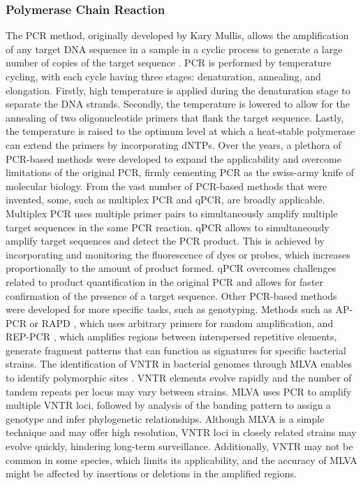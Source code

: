 \subsubsection{Polymerase Chain Reaction}

The \ac{PCR} method, originally developed by Kary Mullis, allows the amplification of any target \ac{DNA} sequence in a sample in a cyclic process to generate a large number of copies of the target sequence \cite{mullis_specific_1986}. \ac{PCR} is performed by temperature cycling, with each cycle having three stages: denaturation, annealing, and elongation. Firstly, high temperature is applied during the denaturation stage to separate the \ac{DNA} strands. Secondly, the temperature is lowered to allow for the annealing of two oligonucleotide primers that flank the target sequence. Lastly, the temperature is raised to the optimum level at which a heat-stable polymerase can extend the primers by incorporating \ac{dNTP}s. Over the years, a plethora of \ac{PCR}-based methods were developed to expand the applicability and overcome limitations of the original \ac{PCR}, firmly cementing \ac{PCR} as the swiss-army knife of molecular biology.
From the vast number of \ac{PCR}-based methods that were invented, some, such as multiplex \ac{PCR} and \ac{qPCR}, are broadly applicable. Multiplex \ac{PCR} \cite{chamberlain_deletion_1988} uses multiple primer pairs to simultaneously amplify multiple target sequences in the same \ac{PCR} reaction.
\ac{qPCR} \cite{higuchi_simultaneous_1992, kubista_real-time_2006} allows to simultaneously amplify target sequences and detect the \ac{PCR} product. This is achieved by incorporating and monitoring the fluorescence of dyes or probes, which increases proportionally to the amount of product formed. \ac{qPCR} overcomes challenges related to product quantification in the original \ac{PCR} and allows for faster confirmation of the presence of a target sequence.
Other \ac{PCR}-based methods were developed for more specific tasks, such as genotyping. Methods such as \ac{AP-PCR or RAPD} \cite{welsh_fingerprinting_1990, williams_dna_1990}, which uses arbitrary primers for random amplification, and \ac{REP-PCR} \cite{versalovic_distribution_1991, de_bruijn_use_1992}, which amplifies regions between interspersed repetitive elements, generate fragment patterns that can function as signatures for specific bacterial strains. The identification of \ac{VNTR} in bacterial genomes through \ac{MLVA} enables to identify polymorphic sites \cite{lindstedt_multiple-locus_2005}. \ac{VNTR} elements evolve rapidly and the number of tandem repeats per locus may vary between strains. \ac{MLVA} uses \ac{PCR} to amplify multiple \ac{VNTR} loci, followed by analysis of the banding pattern to assign a genotype and infer phylogenetic relationships. Although \ac{MLVA} is a simple technique and may offer high resolution, \ac{VNTR} loci in closely related strains may evolve quickly, hindering long-term surveillance. Additionally, \ac{VNTR} may not be common in some species, which limits its applicability, and the accuracy of \ac{MLVA} might be affected by insertions or deletions in the amplified regions.
